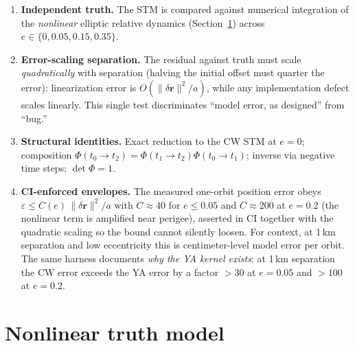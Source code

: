\documentclass[11pt]{article}
\begin{document}
\begin{enumerate}
  \item \textbf{Independent truth.} The STM is compared against numerical
        integration of the \emph{nonlinear} elliptic relative dynamics
        (Section~\ref{sec:truth}) across $e \in \{0, 0.05, 0.15, 0.35\}$.
  \item \textbf{Error-scaling separation.} The residual against truth must
        scale \emph{quadratically} with separation (halving the initial
        offset must quarter the error): linearization error is
        $O(\lVert\delta\mathbf r\rVert^2/a)$, while any implementation
        defect scales linearly. This single test discriminates ``model
        error, as designed'' from ``bug.''
  \item \textbf{Structural identities.} Exact reduction to the CW STM at
        $e=0$; composition $\Phi(t_0{\to}t_2) =
        \Phi(t_1{\to}t_2)\Phi(t_0{\to}t_1)$; inverse via negative time
        steps; $\det\Phi = 1$.
  \item \textbf{CI-enforced envelopes.} The measured one-orbit position
        error obeys $\varepsilon \le C(e)\,\lVert\delta\mathbf r\rVert^2/a$
        with $C \approx 40$ for $e \le 0.05$ and $C \approx 200$ at
        $e = 0.2$ (the nonlinear term is amplified near perigee), asserted
        in CI together with the quadratic scaling so the bound cannot
        silently loosen. For context, at 1\,km separation and low
        eccentricity this is centimeter-level model error per orbit.
        The same harness documents \emph{why the YA kernel exists}: at
        1\,km separation the CW error exceeds the YA error by a factor
        ${>}30$ at $e=0.05$ and ${>}100$ at $e=0.2$.
\end{enumerate}

\section{Nonlinear truth model}
\label{sec:truth}
\end{document}
